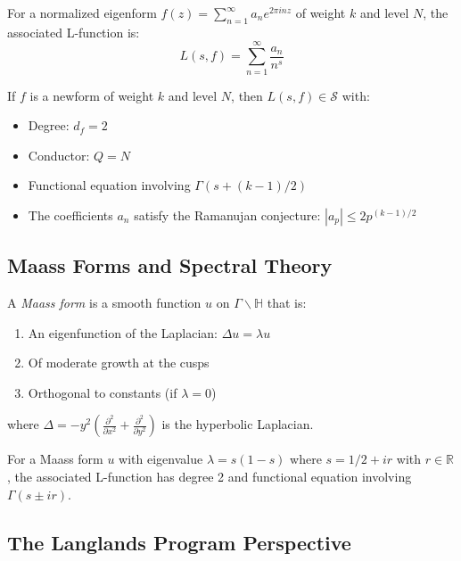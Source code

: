 \begin{definition}
For a normalized eigenform $f(z) = \sum_{n=1}^{\infty} a_n e^{2\pi i nz}$ of weight $k$ and level $N$, the associated L-function is:
\begin{equation}
L(s,f) = \sum_{n=1}^{\infty} \frac{a_n}{n^s}
\end{equation}
\end{definition}

\begin{theorem}
If $f$ is a newform of weight $k$ and level $N$, then $L(s,f) \in \mathcal{S}$ with:
\begin{itemize}
\item Degree: $d_f = 2$
\item Conductor: $Q = N$
\item Functional equation involving $\Gamma(s + (k-1)/2)$
\item The coefficients $a_n$ satisfy the Ramanujan conjecture: $|a_p| \leq 2p^{(k-1)/2}$ \cite{iwanieckowalski2004}
\end{itemize}
\end{theorem}

\subsection{Maass Forms and Spectral Theory}

\begin{definition}
A \emph{Maass form} is a smooth function $u$ on $\Gamma\backslash\mathbb{H}$ that is:
\begin{enumerate}
\item An eigenfunction of the Laplacian: $\Delta u = \lambda u$
\item Of moderate growth at the cusps
\item Orthogonal to constants (if $\lambda = 0$)
\end{enumerate}
where $\Delta = -y^2\left(\frac{\partial^2}{\partial x^2} + \frac{\partial^2}{\partial y^2}\right)$ is the hyperbolic Laplacian.
\end{definition}

For a Maass form $u$ with eigenvalue $\lambda = s(1-s)$ where $s = 1/2 + ir$ with $r \in \mathbb{R}$, the associated L-function has degree 2 and functional equation involving $\Gamma(s \pm ir)$.

\subsection{The Langlands Program Perspective}

